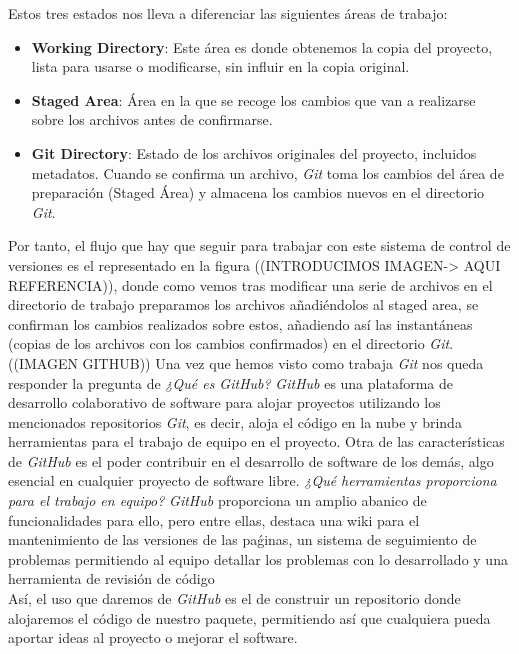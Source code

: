 \documentclass[a4paper, 12pt]{book}
\begin{document}
Estos tres estados nos lleva a diferenciar las siguientes áreas de trabajo: 
\begin{itemize}
    \item \textbf{Working Directory}: Este área es donde obtenemos la copia del proyecto, lista para usarse o modificarse, sin influir en la copia original.
    \item \textbf{Staged Area}: Área en la que se recoge los cambios que van a realizarse sobre los archivos antes de confirmarse.
    \item \textbf{Git Directory}: Estado de los archivos originales del proyecto, incluidos metadatos. Cuando se confirma un archivo, \emph{Git} toma los cambios del área de preparación (Staged Área) y almacena los cambios nuevos en el directorio \emph{Git}.
\end{itemize}
Por tanto, el flujo que hay que seguir para trabajar con este sistema de control de versiones es el representado en la figura ((INTRODUCIMOS IMAGEN-> AQUI REFERENCIA)), donde como vemos tras modificar una serie de archivos en el directorio de trabajo preparamos los archivos añadiéndolos al staged area, se confirman los cambios realizados sobre estos, añadiendo así las instantáneas (copias de los archivos con los cambios confirmados) en el directorio \emph{Git}. \\
((IMAGEN GITHUB))
Una vez que hemos visto como trabaja \emph{Git} nos queda responder la pregunta de \textit{¿Qué es GitHub?} \emph{GitHub} es una plataforma de desarrollo colaborativo de software para alojar proyectos utilizando los mencionados repositorios \emph{Git}, es decir, aloja el código en la nube y brinda herramientas para el trabajo de equipo en el proyecto. Otra de las características de \emph{GitHub} es el poder contribuir en el desarrollo de software de los demás, algo esencial en cualquier proyecto de software libre. \textit{¿Qué herramientas proporciona para el trabajo en equipo?} \emph{GitHub} proporciona un amplio abanico de funcionalidades para ello, pero entre ellas, destaca una wiki para el mantenimiento de las versiones de las paǵinas, un sistema de seguimiento de problemas permitiendo al equipo detallar los problemas con lo desarrollado y una herramienta de revisión de código \\ %
Así, el uso que daremos de \emph{GitHub} es el de construir un repositorio donde alojaremos el código de nuestro paquete, permitiendo así que cualquiera pueda aportar ideas al proyecto o mejorar el software.\\
\end{document}
